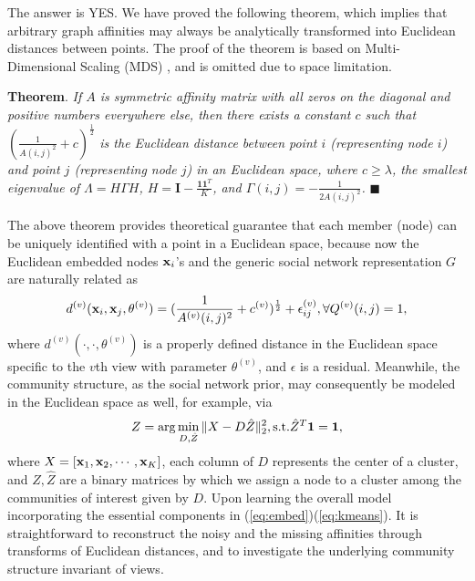 The answer is YES. We have proved the following theorem, which implies that arbitrary graph affinities may always be analytically transformed into Euclidean distances between points. The proof of the theorem is based on Multi-Dimensional Scaling (MDS) \cite{CoxMDS}, and is omitted due to space limitation.

\vspace{5pt}
\textbf{Theorem}. \textit{If $A$ is symmetric affinity matrix with all zeros on the diagonal and positive numbers everywhere else, then there exists a constant $c$ such that $(\frac{1}{A(i,j)^2}+c)^{\frac{1}{2}}$ is the Euclidean distance between point $i$ (representing node $i$) and point $j$ (representing node $j$) in an Euclidean space, where $c\geq\lambda$, the smallest eigenvalue of $\Lambda=H\Gamma H$, $H=\mathbf{I}-\frac{\mathbf{1}\mathbf{1}^T}{K}$, and $\Gamma(i,j)=-\frac{1}{2A(i,j)^2}$.} $\blacksquare$
\vspace{5pt}


The above theorem provides theoretical guarantee that each member (node) can be uniquely identified with a point in a Euclidean space, because now the Euclidean embedded nodes ${\bf x}_i$'s and the generic social network representation $G$ are naturally related as
\begin{equation}\label{eq:embed}
d^{(v)}({\bf x}_i, {\bf x}_j, \theta^{(v)})=(\frac{1}{A^{(v)}(i,j)^2}+c^{(v)})^{\frac{1}{2}}+\epsilon^{(v)}_{ij}, \forall Q^{(v)}(i,j)=1,
\end{equation}
where $d^{(v)}(\cdot, \cdot, \theta^{(v)})$ is a properly defined distance in the Euclidean space specific to the $v$th view with parameter $\theta^{(v)}$, and $\epsilon$ is a residual. Meanwhile, the community structure, as the social network prior, may consequently  be modeled in the Euclidean space as well, for example, via
\begin{equation}\label{eq:kmeans}
Z=\arg\min_{D,\hat{Z}}\|X-D\hat{Z}\|^{2}_{2}, \textup{s.t.} \hat{Z}^{T}\mathbf{1}=\mathbf{1},
 \end{equation}
where $X=[{\bf x}_1,{\bf x}_2,\cdots,{\bf x}_K]$, each column of $D$ represents the center of a cluster, and $Z, \hat{Z}$ are a binary matrices by which we assign a node to a cluster among the communities of interest given by $D$. Upon learning the overall model incorporating the essential components in (\ref{eq:embed})(\ref{eq:kmeans}). It is straightforward to reconstruct the noisy and the missing affinities through transforms of Euclidean distances, and to investigate the underlying community structure invariant of views.


